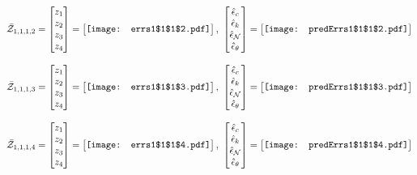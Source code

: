 \documentclass[12pt]{article}
\begin{document}
\begin{gather*}
\bar{\mathcal{Z}}_{1,1,1,2}=\begin{bmatrix}
z_1\\
z_2\\
z_3\\
z_4
 \end{bmatrix}= \begin{bmatrix}
\vcenter{\hbox{\texttt{[image: errs1\$1\$1\$2.pdf]}}}
 \end{bmatrix},\,\, \begin{bmatrix}
\hat{\epsilon}_c\\\hat{\epsilon}_k\\\hat{\epsilon}_\mathcal{N}\\\hat{\epsilon}_\theta
 \end{bmatrix}=\begin{bmatrix}
\vcenter{\hbox{\texttt{[image: predErrs1\$1\$1\$2.pdf]}}}
 \end{bmatrix}
\end{gather*}


\begin{gather*}
\bar{\mathcal{Z}}_{1,1,1,3}=\begin{bmatrix}
z_1\\
z_2\\
z_3\\
z_4
 \end{bmatrix}= \begin{bmatrix}
\vcenter{\hbox{\texttt{[image: errs1\$1\$1\$3.pdf]}}}
 \end{bmatrix},\,\, \begin{bmatrix}
\hat{\epsilon}_c\\\hat{\epsilon}_k\\\hat{\epsilon}_\mathcal{N}\\\hat{\epsilon}_\theta
 \end{bmatrix}=\begin{bmatrix}
\vcenter{\hbox{\texttt{[image: predErrs1\$1\$1\$3.pdf]}}}
 \end{bmatrix}
\end{gather*}


\begin{gather*}
\bar{\mathcal{Z}}_{1,1,1,4}=\begin{bmatrix}
z_1\\
z_2\\
z_3\\
z_4
 \end{bmatrix}= \begin{bmatrix}
\vcenter{\hbox{\texttt{[image: errs1\$1\$1\$4.pdf]}}}
 \end{bmatrix},\,\, \begin{bmatrix}
\hat{\epsilon}_c\\\hat{\epsilon}_k\\\hat{\epsilon}_\mathcal{N}\\\hat{\epsilon}_\theta
 \end{bmatrix}=\begin{bmatrix}
\vcenter{\hbox{\texttt{[image: predErrs1\$1\$1\$4.pdf]}}}
 \end{bmatrix}
\end{gather*}
\end{document}
